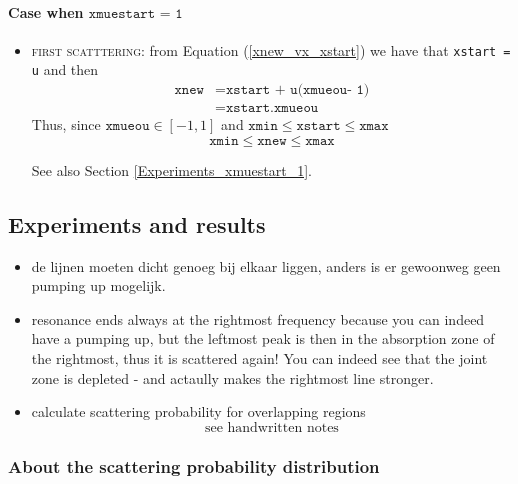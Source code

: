 \documentclass[../main/main.tex]{subfiles}
\begin{document}
\paragraph{Case when $\texttt{xmuestart = 1}$}
\begin{itemize}
\item \textsc{first scatttering}: from Equation (\ref{xnew_vx_xstart}) we have that \texttt{xstart = u} and then
\begin{equation}
\begin{aligned}
\texttt{xnew} &= \texttt{xstart + u(xmueou- 1)} \\
&= \texttt{xstart.xmueou}
\end{aligned}
\end{equation}
Thus, since $\texttt{xmueou} \in [-1,1]$ and $\texttt{xmin} \leq \texttt{xstart} \leq \texttt{xmax}$
\begin{equation}
\texttt{xmin} \leq \texttt{xnew} \leq \texttt{xmax}
\end{equation}

See also Section \ref{Experiments_xmuestart_1}.

\end{itemize}


\newpage
\subsection{Experiments and results}
\begin{itemize}
\item de lijnen moeten dicht genoeg bij elkaar liggen, anders is er gewoonweg geen pumping up mogelijk.

\item resonance ends always at the rightmost frequency because you can indeed have a pumping up, but the leftmost peak is then in the absorption zone of the rightmost, thus it is scattered again! You can indeed see that the joint zone is depleted - and actaully makes the rightmost line stronger.

\item calculate scattering probability for overlapping regions
\begin{equation}
\text{see handwritten notes}
\end{equation}

\end{itemize}


\subsubsection{About the scattering probability distribution}
\end{document}
